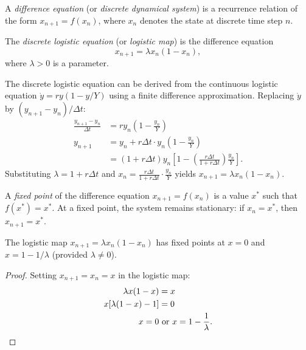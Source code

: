 \documentclass[a4paper]{article}
\begin{document}
\begin{defi}
  A \emph{difference equation} (or \emph{discrete dynamical system}) is a recurrence relation of the form $x_{n+1} = f(x_n)$, where $x_n$ denotes the state at discrete time step $n$.
\end{defi}

\begin{defi}
  The \emph{discrete logistic equation} (or \emph{logistic map}) is the difference equation
  \[
    x_{n + 1} = \lambda x_n(1 - x_n),
  \]
  where $\lambda > 0$ is a parameter.
\end{defi}

\begin{remark}
  The discrete logistic equation can be derived from the continuous logistic equation $\dot{y} = ry(1 - y/Y)$ using a finite difference approximation. Replacing $\dot{y}$ by $(y_{n+1} - y_n)/\Delta t$:
  \begin{align*}
    \frac{y_{n+1} - y_n}{\Delta t} &= ry_n\left(1 - \frac{y_n}{Y}\right)\\
    y_{n + 1} &= y_n + r\Delta t \cdot y_n\left(1 - \frac{y_n}{Y}\right)\\
    &= (1 + r\Delta t)y_n\left[1 - \left(\frac{r\Delta t}{1 + r\Delta t}\right)\frac{y_n}{Y}\right].
  \end{align*}
  Substituting $\lambda = 1 + r\Delta t$ and $x_n = \frac{r\Delta t}{1 + r\Delta t} \cdot \frac{y_n}{Y}$ yields $x_{n+1} = \lambda x_n(1 - x_n)$.
\end{remark}

\begin{defi}
  A \emph{fixed point} of the difference equation $x_{n+1} = f(x_n)$ is a value $x^*$ such that $f(x^*) = x^*$. At a fixed point, the system remains stationary: if $x_n = x^*$, then $x_{n+1} = x^*$.
\end{defi}

\begin{prop}
  The logistic map $x_{n+1} = \lambda x_n(1 - x_n)$ has fixed points at $x = 0$ and $x = 1 - 1/\lambda$ (provided $\lambda \neq 0$).
\end{prop}
\begin{proof}
  Setting $x_{n+1} = x_n = x$ in the logistic map:
  \begin{align*}
    \lambda x(1 - x) &= x\\
    x[\lambda(1 - x) - 1] &= 0\\
    x = 0 &\text{ or } x = 1 - \frac{1}{\lambda}. \qedhere
  \end{align*}
\end{proof}
\end{document}
